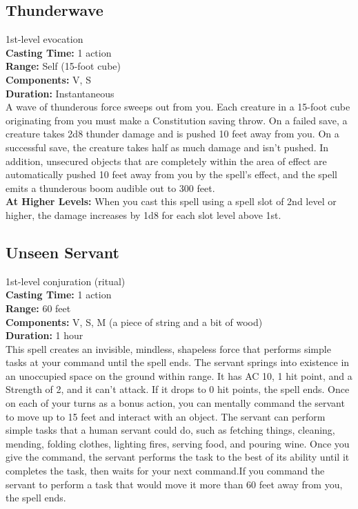 \documentclass[11pt, A4paper, english]{article}
\begin{document}
		\subsection{Thunderwave}
1st-level evocation \\
\textbf{Casting Time:} 1 action \\
\textbf{Range:} Self (15-foot cube) \\
\textbf{Components:} V, S \\
\textbf{Duration:} Instantaneous \\
A wave of thunderous force sweeps out from you. Each creature in a 15-foot cube originating from you must make a Constitution saving throw. On a failed save, a creature takes 2d8 thunder damage and is pushed 10 feet away from you. On a successful save, the creature takes half as much damage and isn't pushed. In addition, unsecured objects that are completely within the area of effect are automatically pushed 10 feet away from you by the spell's effect, and the spell emits a thunderous boom audible out to 300 feet. \\
\textbf{At Higher Levels:} When you cast this spell using a spell slot of 2nd level or higher, the damage increases by 1d8 for each slot level above 1st.

		\subsection{Unseen Servant}
1st-level conjuration (ritual) \\
\textbf{Casting Time:} 1 action \\
\textbf{Range:} 60 feet \\
\textbf{Components:} V, S, M (a piece of string and a bit of wood) \\
\textbf{Duration:} 1 hour \\
This spell creates an invisible, mindless, shapeless force that performs simple tasks at your command until the spell ends. The servant springs into existence in an unoccupied space on the ground within range. It has AC 10, 1 hit point, and a Strength of 2, and it can’t attack. If it drops to 0 hit points, the spell ends. Once on each of your turns as a bonus action, you can mentally command the servant to move up to 15 feet and interact with an object. The servant can perform simple tasks that a human servant could do, such as fetching things, cleaning, mending, folding clothes, lighting fires, serving food, and pouring wine. Once you give the command, the servant performs the task to the best of its ability until it completes the task, then waits for your next command.If you command the servant to perform a task that would move it more than 60 feet away from you, the spell ends.
\end{document}
